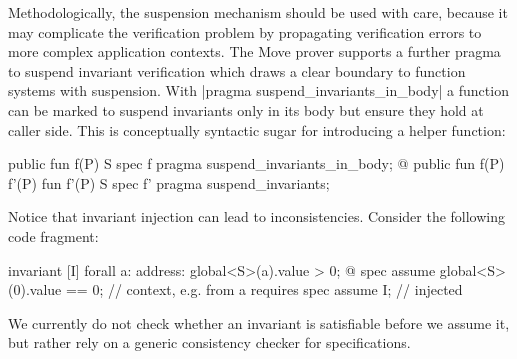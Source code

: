 Methodologically, the suspension mechanism should be used with care, because it
may complicate the verification problem by propagating verification errors to
more complex application contexts. The Move prover supports a further pragma to
suspend invariant verification which draws a clear boundary to function systems
with suspension. With |pragma suspend_invariants_in_body| a function can be
marked to suspend invariants only in its body but ensure they hold at caller
side. This is conceptually syntactic sugar for introducing a helper function:

\begin{Move}
  public fun f(P) { S }
  spec f { pragma suspend_invariants_in_body; }
  @\transform@
  public fun f(P) { f'(P) }
  fun f'(P) { S } spec f' { pragma suspend_invariants; }
\end{Move}





Notice that invariant injection can lead to inconsistencies. Consider the following
code fragment:

\begin{Move}
  invariant [I] forall a: address: global<S>(a).value > 0;
  @\transform@
  spec assume global<S>(0).value == 0;  // context, e.g. from a requires
  spec assume I;                        // injected
\end{Move}

\noindent We currently do not check whether an invariant is satisfiable
before we assume it, but rather rely on a generic consistency checker for
specifications.



